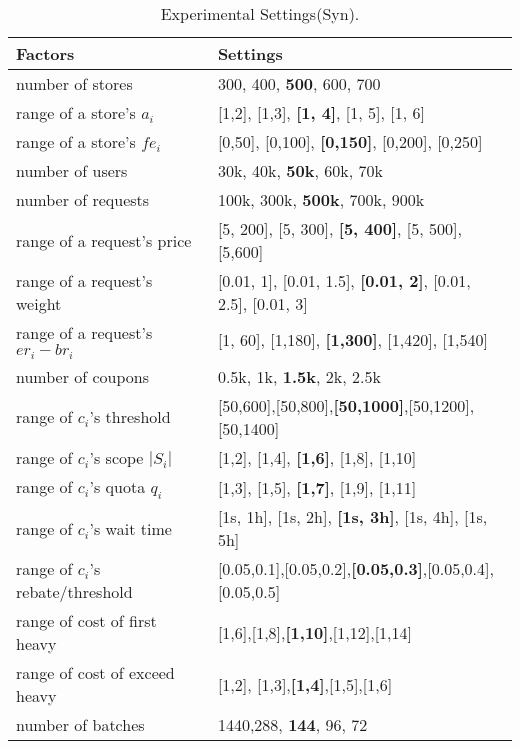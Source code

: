 \begin{table}[t!]
	\begin{center}%
		{\small\scriptsize %
			\caption{\small Experimental Settings(Syn).} \label{tab:syn_settings}
			\begin{tabular}{l|l}
				{\bf \qquad \qquad \quad Factors} & {\bf \qquad \qquad \qquad Settings} \\ \hline \hline
				number of stores  & 300, 400, \textbf{500}, 600, 700\\
				range of a store's $a_i$ & [1,2], [1,3], \textbf{[1, 4]}, [1, 5], [1, 6] \\
				range of a store's $fe_i$& [0,50], [0,100], \textbf{[0,150]}, [0,200], [0,250] \\
				number of users & 30k, 40k, \textbf{50k}, 60k, 70k \\
				number of requests & 100k, 300k, \textbf{500k}, 700k, 900k\\
				range of a request's price & [5, 200], [5, 300], \textbf{[5, 400]}, [5, 500], [5,600] \\
				range of a request's weight & [0.01, 1], [0.01, 1.5], \textbf{[0.01, 2]}, [0.01, 2.5], [0.01, 3] \\
				range of a request's $er_i-br_i$ & [1, 60], [1,180], \textbf{[1,300]}, [1,420], [1,540]\\
				number of coupons & 0.5k, 1k, \textbf{1.5k}, 2k, 2.5k \\
				range of $c_i$'s threshold & [50,600],[50,800],\textbf{[50,1000]},[50,1200],[50,1400]\\
				range of $c_i$'s scope $|S_i|$ & [1,2], [1,4], \textbf{[1,6]}, [1,8], [1,10] \\
				range of $c_i$'s quota $q_i$ & [1,3], [1,5], \textbf{[1,7]}, [1,9], [1,11] \\
				range of $c_i$'s wait time & [1s, 1h], [1s, 2h], \textbf{[1s, 3h]}, [1s, 4h], [1s, 5h] \\
				range of $c_i$'s rebate/threshold & [0.05,0.1],[0.05,0.2],\textbf{[0.05,0.3]},[0.05,0.4],[0.05,0.5]\\
				range of cost of first heavy & [1,6],[1,8],\textbf{[1,10]},[1,12],[1,14]\\
				range of cost of exceed heavy & [1,2], [1,3],\textbf{[1,4]},[1,5],[1,6]\\
				number of batches & 1440,288, \textbf{144}, 96, 72 \\
				\hline
			\end{tabular}
		}\vspace{-6ex}
	\end{center}
\end{table}


